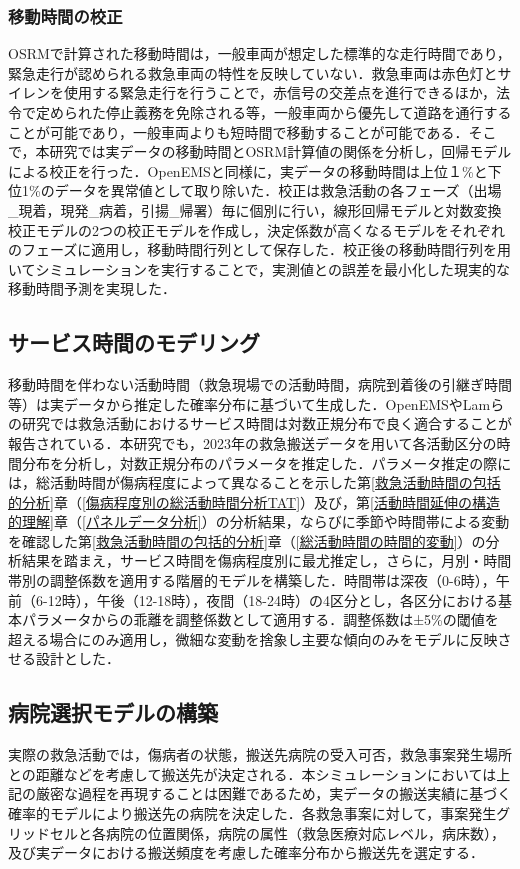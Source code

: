 \subsubsection{移動時間の校正}
OSRMで計算された移動時間は，一般車両が想定した標準的な走行時間であり，緊急走行が認められる救急車両の特性を反映していない．救急車両は赤色灯とサイレンを使用する緊急走行を行うことで，赤信号の交差点を進行できるほか，法令で定められた停止義務を免除される等，一般車両から優先して道路を通行することが可能であり，一般車両よりも短時間で移動することが可能である．そこで，本研究では実データの移動時間とOSRM計算値の関係を分析し，回帰モデルによる校正を行った．OpenEMSと同様に，実データの移動時間は上位１\%と下位1\%のデータを異常値として取り除いた．校正は救急活動の各フェーズ（出場\_現着，現発\_病着，引揚\_帰署）毎に個別に行い，線形回帰モデルと対数変換校正モデルの2つの校正モデルを作成し，決定係数が高くなるモデルをそれぞれのフェーズに適用し，移動時間行列として保存した．校正後の移動時間行列を用いてシミュレーションを実行することで，実測値との誤差を最小化した現実的な移動時間予測を実現した．

\subsection{サービス時間のモデリング}
移動時間を伴わない活動時間（救急現場での活動時間，病院到着後の引継ぎ時間等）は実データから推定した確率分布に基づいて生成した．OpenEMSやLamら\cite{Lam2016}の研究では救急活動におけるサービス時間は対数正規分布で良く適合することが報告されている．本研究でも，2023年の救急搬送データを用いて各活動区分の時間分布を分析し，対数正規分布のパラメータを推定した．パラメータ推定の際には，総活動時間が傷病程度によって異なることを示した第\ref{救急活動時間の包括的分析}章（\ref{傷病程度別の総活動時間分析TAT}）及び，第\ref{活動時間延伸の構造的理解}章（\ref{パネルデータ分析}）の分析結果，ならびに季節や時間帯による変動を確認した第\ref{救急活動時間の包括的分析}章（\ref{総活動時間の時間的変動}）の分析結果を踏まえ，サービス時間を傷病程度別に最尤推定し，さらに，月別・時間帯別の調整係数を適用する階層的モデルを構築した．時間帯は深夜（0-6時），午前（6-12時），午後（12-18時），夜間（18-24時）の4区分とし，各区分における基本パラメータからの乖離を調整係数として適用する．調整係数は±5\%の閾値を超える場合にのみ適用し，微細な変動を捨象し主要な傾向のみをモデルに反映させる設計とした．

\subsection{病院選択モデルの構築}
実際の救急活動では，傷病者の状態，搬送先病院の受入可否，救急事案発生場所との距離などを考慮して搬送先が決定される．本シミュレーションにおいては上記の厳密な過程を再現することは困難であるため，実データの搬送実績に基づく確率的モデルにより搬送先の病院を決定した．各救急事案に対して，事案発生グリッドセルと各病院の位置関係，病院の属性（救急医療対応レベル，病床数），及び実データにおける搬送頻度を考慮した確率分布から搬送先を選定する．


